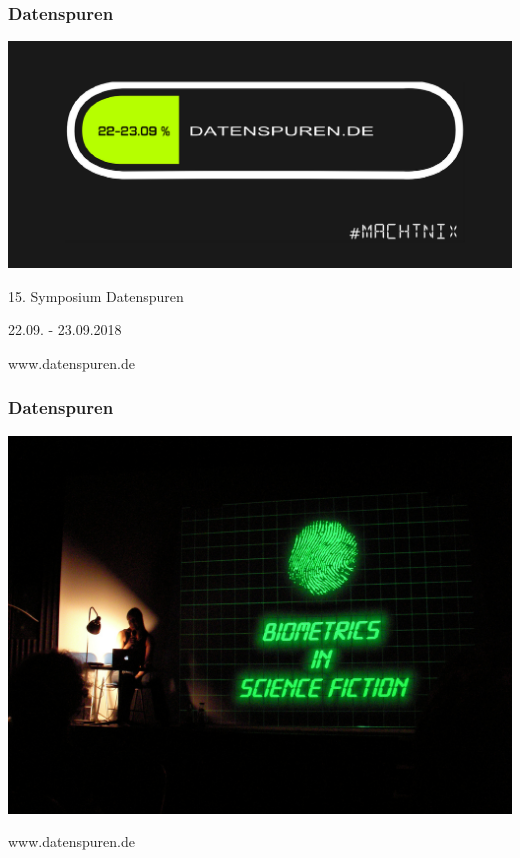 \documentclass[12pt]{beamer}
\begin{document}
	\begin{frame}
		\frametitle{Datenspuren}
		\begin{center}
			\includegraphics[height=0.5\textheight]{img//datenspuren2018.png}
			\vspace{20pt}	
			
			15. Symposium Datenspuren

			22.09. - 23.09.2018 
			
			www.datenspuren.de
		\end{center}
	\end{frame}
	\begin{frame}
		\frametitle{Datenspuren}
		\begin{center}			
			\includegraphics[height=0.7\textheight]{img//datenspuren2006.jpg}
			
			www.datenspuren.de
		\end{center}
	\end{frame}	
	
\end{document}
